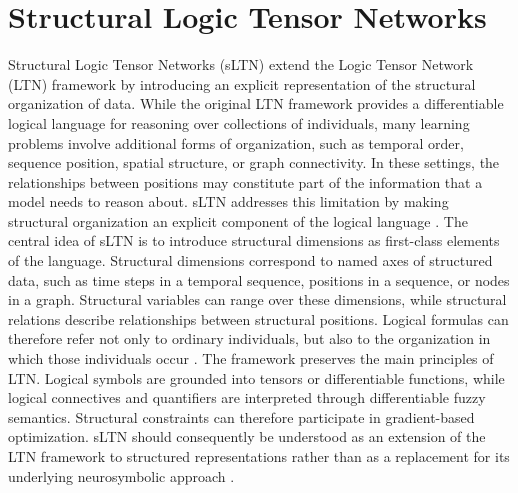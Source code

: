 \chapter{Structural Logic Tensor Networks}
\label{chap:SLTN}

\noindent
Structural Logic Tensor Networks (sLTN) extend the Logic Tensor Network (LTN) framework by introducing an explicit representation of the structural organization of data. While the original LTN framework provides a differentiable logical language for reasoning over collections of individuals, many learning problems involve additional forms of organization, such as temporal order, sequence position, spatial structure, or graph connectivity. In these settings, the relationships between positions may constitute part of the information that a model needs to reason about. sLTN addresses this limitation by making structural organization an explicit component of the logical language \cite{rinaldi2026sltn}.
The central idea of sLTN is to introduce structural dimensions as first-class elements of the language. Structural dimensions correspond to named axes of structured data, such as time steps in a temporal sequence, positions in a sequence, or nodes in a graph. Structural variables can range over these dimensions, while structural relations describe relationships between structural positions. Logical formulas can therefore refer not only to ordinary individuals, but also to the organization in which those individuals occur \cite{rinaldi2026sltn}.
The framework preserves the main principles of LTN. Logical symbols are grounded into tensors or differentiable functions, while logical connectives and quantifiers are interpreted through differentiable fuzzy semantics. Structural constraints can therefore participate in gradient-based optimization. sLTN should consequently be understood as an extension of the LTN framework to structured representations rather than as a replacement for its underlying neurosymbolic approach \cite{rinaldi2026sltn}.

